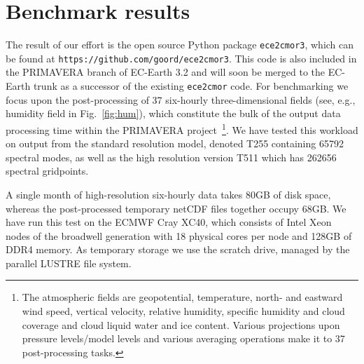 \documentclass[procedia]{easychair}
\begin{document}
\section{Benchmark results}
The result of our effort is the open source Python package \texttt{ece2cmor3}, 
which can be found at \texttt{https://github.com/goord/ece2cmor3}. This code is 
also included in the PRIMAVERA branch of EC-Earth 3.2 and will soon be merged 
to the EC-Earth trunk as a successor of the existing \texttt{ece2cmor} code. 
For benchmarking we focus upon the post-processing of 37 six-hourly 
three-dimensional fields (see, e.g., humidity field in Fig.~\ref{fig:hum}), 
which constitute the bulk of the output data 
processing time within the PRIMAVERA project~\footnote{The atmospheric fields 
are geopotential, temperature, north- and eastward wind speed, vertical 
velocity, relative humidity, specific humidity and cloud coverage and cloud 
liquid water and ice content. Various projections upon pressure levels/model 
levels and various averaging operations make it to 37 post-processing tasks.}. 
We have tested this workload on output from the standard resolution model, 
denoted T255 containing 65792 spectral modes, as well as the high resolution 
version T511 which has 262656 spectral gridpoints.
  
A single month of high-resolution six-hourly data takes 80GB of disk space, 
whereas the post-processed temporary netCDF files together occupy 68GB. We have 
run this test on the ECMWF Cray XC40, which consists of Intel Xeon nodes of the 
broadwell generation with 18 physical cores per node and 128GB of DDR4 memory. 
As temporary storage we use the scratch drive, managed by the parallel LUSTRE 
file system.
\end{document}
